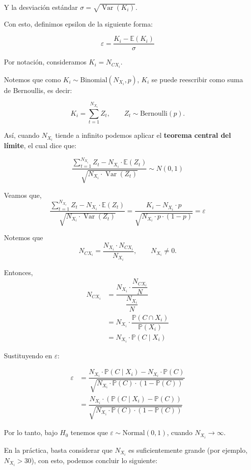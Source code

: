 \documentclass[
 12pt,
 letterpaper,
]{article}
\theoremstyle{teoremaBreak}
\theoremstyle{plain}
\theoremstyle{definition}
\begin{document}
Y la desviación estándar $\sigma = \sqrt{\operatorname{Var}(K_i)}$.

Con esto, definimos epsilon de la siguiente forma:

\[
\varepsilon = \dfrac{{K_i} - \mathbb{E}(K_i)}{\sigma}
\]

Por notación, consideramos $K_{i} = N_{CX_i}$.

Notemos que como $K_i \sim \text{Binomial}(N_{X_i}, p)$, $K_i$ se
puede reescribir como suma de Bernoullis, es decir:

\[
K_i = \sum_{t = 1}^{N_{X_i}} Z_t, \qquad Z_t \sim \text{Bernoulli}(p).
\]

Así, cuando $N_{X_i}$ tiende a infinito podemos aplicar el \textbf{teorema central del límite}, el cual dice
que:

$$\dfrac{\sum_{t = 1}^{N_{X_i}} Z_t - N_{X_i} \cdot \mathbb{E}(Z_t)}{\sqrt{N_{X_i} \cdot \operatorname{Var}(Z_t)}} \sim N(0,1)$$

Veamos que,
$$\dfrac{\sum_{t = 1}^{N_{X_i}} Z_t - N_{X_i} \cdot \mathbb{E}(Z_t)}{\sqrt{N_{X_i} \cdot \operatorname{Var}(Z_t)}}
= \dfrac{K_i - N_{X_i} \cdot p}{\sqrt{N_{X_i} \cdot p \cdot (1 - p)}} = \varepsilon$$

Notemos que
\[
N_{CX_i} = \dfrac{N_{X_i} \cdot N_{CX_i}}{N_{X_i}}, \qquad N_{X_i} \neq 0.
\]

Entonces,
\begin{align*}
N_{CX_i}
&= \dfrac{N_{X_i} \cdot \dfrac{N_{CX_i}}{N}}{\dfrac{N_{X_i}}{N}} \\
&= N_{X_i} \cdot \dfrac{\mathbb{P}(C \cap X_i)}{\mathbb{P}(X_i)} \\
&= N_{X_i} \cdot \mathbb{P}(C \mid X_i)
\end{align*}

Sustituyendo en $\varepsilon$:

\begin{align*}
\varepsilon
&= \dfrac{N_{X_i} \cdot \mathbb{P}(C \mid X_i) - N_{X_i} \cdot \mathbb{P}(C)}{\sqrt{N_{X_i} \cdot \mathbb{P}(C) \cdot (1 - \mathbb{P}(C))}} \\
&= \dfrac{N_{X_i} \cdot \left(\mathbb{P}(C \mid X_i) - \mathbb{P}(C)\right)}{\sqrt{N_{X_i} \cdot \mathbb{P}(C) \cdot (1 - \mathbb{P}(C))}}
\end{align*}

Por lo tanto, bajo $H_0$ tenemos que $\varepsilon \sim \text{Normal}(0, 1)$,
cuando $N_{X_i}  \to \infty$.



En la práctica, basta considerar que $N_{X_i}$ es suficientemente grande (por ejemplo, $N_{X_i} > 30$), 
con esto, podemos concluir lo siguiente:
\end{document}
